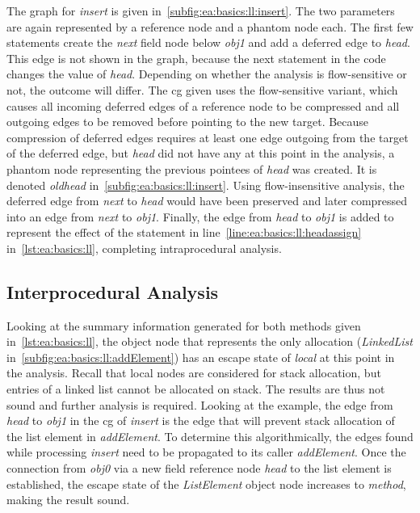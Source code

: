 			The graph for \emph{insert} is given in~\cref{subfig:ea:basics:ll:insert}. The two parameters are again
			represented by a reference node and a phantom node each. The first few statements create the \emph{next} field
			node below \emph{obj1} and add a deferred edge to \emph{head}. This edge is not shown in the graph, because the
			next statement in the code changes the value of \emph{head}. Depending on whether the analysis is flow-sensitive
			or not, the outcome will differ. The \gls{cg} given uses the flow-sensitive variant, which causes all incoming
			deferred edges of a reference node to be compressed and all outgoing edges to be removed before pointing to the
			new target. Because compression of deferred edges requires at least one edge outgoing from the target of the
			deferred edge, but \emph{head} did not have any at this point in the analysis, a phantom node representing the
			previous pointees of \emph{head} was created. It is denoted \emph{oldhead} in~\cref{subfig:ea:basics:ll:insert}.
			Using flow-insensitive analysis, the deferred edge from \emph{next} to \emph{head} would have been preserved and
			later compressed into an edge from \emph{next} to \emph{obj1}. Finally, the edge from \emph{head} to \emph{obj1}
			is added to represent the effect of the statement in line~\ref{line:ea:basics:ll:headassign}
			in~\cref{lst:ea:basics:ll}, completing intraprocedural analysis.

		\subsection{Interprocedural Analysis}
			\label{sub:ea:basics:global}
			Looking at the summary information generated for both methods given in~\cref{lst:ea:basics:ll}, the object node
			that represents the only allocation (\emph{LinkedList} in~\cref{subfig:ea:basics:ll:addElement}) has an escape
			state of \emph{local} at this point in the analysis. Recall that local nodes are considered for stack allocation,
			but entries of a linked list cannot be allocated on stack. The results are thus not sound and further analysis is
			required. Looking at the example, the edge from \emph{head} to \emph{obj1} in the \gls{cg} of \emph{insert} is the
			edge that will prevent stack allocation of the list element in \emph{addElement}. To determine this
			algorithmically, the edges found while processing \emph{insert} need to be propagated to its caller
			\emph{addElement}. Once the connection from \emph{obj0} via a new field reference node \emph{head} to the list
			element is established, the escape state of the \emph{ListElement} object node increases to \emph{method}, making
			the result sound.


